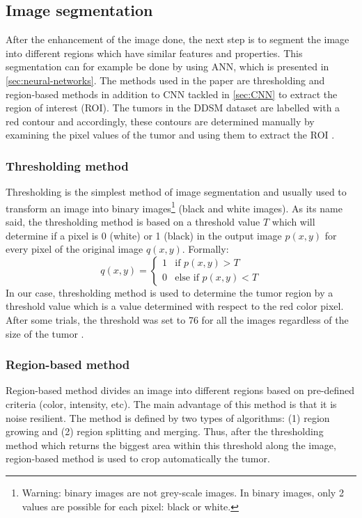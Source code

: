 \documentclass[11pt, openany]{report}
\theoremstyle{plain}
\theoremstyle{definition}
\theoremstyle{remark}
\begin{document}
\subsection{Image segmentation}
After the enhancement of the image done, the next step is to segment the image into different regions which have similar features and properties. This segmentation can for example be done by using ANN, which is presented in \autoref{sec:neural-networks}. The methods used in the paper are thresholding and region-based methods in addition to CNN tackled in \autoref{sec:CNN} to extract the region of interest (ROI). The tumors in the DDSM dataset are labelled with a red contour and accordingly, these contours are determined manually by examining the pixel values of the tumor and using them to extract the ROI \cite{breast-cancer}.

\subsubsection{Thresholding method}
Thresholding is the simplest method of image segmentation and usually used to transform an image into binary images\footnote{Warning: binary images are not grey-scale images. In binary images, only 2 values are possible for each pixel: black or white.} (black and white images). As its name said, the thresholding method is based on a threshold value $T$ which will determine if a pixel is 0 (white) or 1 (black) in the output image $p(x,y)$ for every pixel of the original image $q(x,y)$. Formally: 
$$
q(x,y) = \left\{
    \begin{array}{ll}
        1 & \mbox{if } p(x,y) > T \\
        0 & \mbox{else if } p(x,y) < T
    \end{array}
\right.
$$
In our case, thresholding method is used to determine the tumor region by a threshold value which is a value determined with respect to the red color pixel. After some trials, the threshold was set to 76 for all the images regardless of the size of the tumor \cite{breast-cancer}.

\subsubsection{Region-based method} 
Region-based method divides an image into different regions based on pre-defined criteria (color, intensity, etc). The main advantage of this method is that it is noise resilient. The method is defined by two types of algorithms: (1) region growing and (2) region splitting and merging. Thus, after the thresholding method which returns the biggest area within this threshold along the image, region-based method is used to crop automatically the tumor. 
\end{document}
